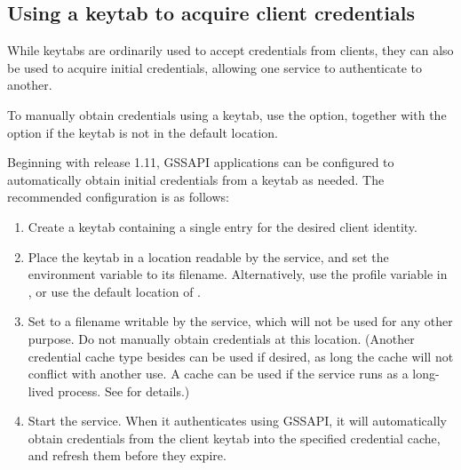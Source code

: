 \documentclass[letterpaper,10pt,english]{sphinxmanual}
\begin{document}
\subsection{Using a keytab to acquire client credentials}
\label{\detokenize{admin/appl_servers:using-a-keytab-to-acquire-client-credentials}}
While keytabs are ordinarily used to accept credentials from clients,
they can also be used to acquire initial credentials, allowing one
service to authenticate to another.

To manually obtain credentials using a keytab, use the 
 option, together with the  option if the keytab is not in
the default location.

Beginning with release 1.11, GSSAPI applications can be configured to
automatically obtain initial credentials from a keytab as needed.  The
recommended configuration is as follows:
\begin{enumerate}
\item {} 
Create a keytab containing a single entry for the desired client
identity.

\item {} 
Place the keytab in a location readable by the service, and set the
 environment variable to its filename.
Alternatively, use the  profile
variable in {\hyperref[\detokenize{admin/conf_files/krb5_conf:libdefaults}]{}}, or use the default location of
{\hyperref[\detokenize{mitK5defaults:paths}]{}}.

\item {} 
Set  to a filename writable by the service, which
will not be used for any other purpose.  Do not manually obtain
credentials at this location.  (Another credential cache type
besides  can be used if desired, as long the cache will not
conflict with another use.  A  cache can be used if the
service runs as a long-lived process.  See 
for details.)

\item {} 
Start the service.  When it authenticates using GSSAPI, it will
automatically obtain credentials from the client keytab into the
specified credential cache, and refresh them before they expire.

\end{enumerate}
\end{document}
